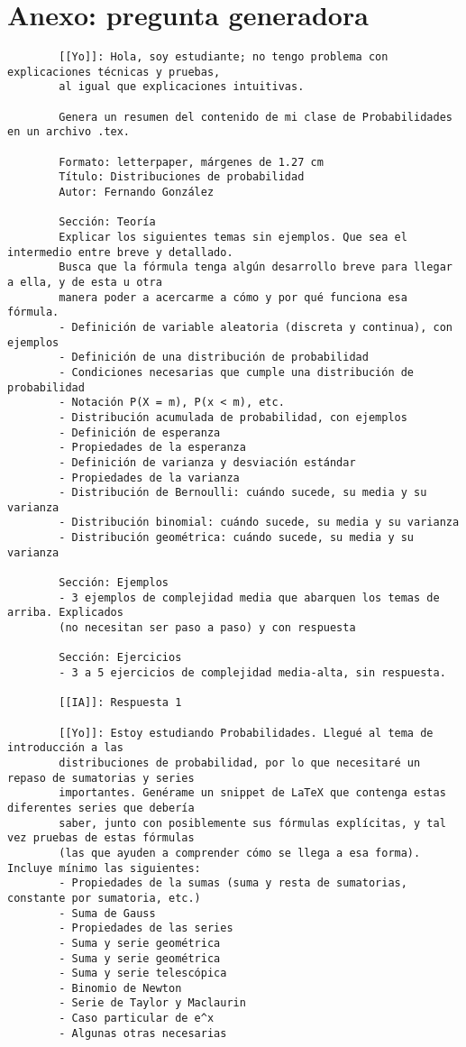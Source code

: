 \documentclass[letterpaper, 12pt]{article}
\begin{document}
	
	\section*{Anexo: pregunta generadora}
	\begin{verbatim}
		[[Yo]]: Hola, soy estudiante; no tengo problema con explicaciones técnicas y pruebas,
		al igual que explicaciones intuitivas.
		
		Genera un resumen del contenido de mi clase de Probabilidades en un archivo .tex.
		
		Formato: letterpaper, márgenes de 1.27 cm
		Título: Distribuciones de probabilidad
		Autor: Fernando González
		
		Sección: Teoría
		Explicar los siguientes temas sin ejemplos. Que sea el intermedio entre breve y detallado.
		Busca que la fórmula tenga algún desarrollo breve para llegar a ella, y de esta u otra
		manera poder a acercarme a cómo y por qué funciona esa fórmula.
		- Definición de variable aleatoria (discreta y continua), con ejemplos
		- Definición de una distribución de probabilidad
		- Condiciones necesarias que cumple una distribución de probabilidad
		- Notación P(X = m), P(x < m), etc.
		- Distribución acumulada de probabilidad, con ejemplos
		- Definición de esperanza
		- Propiedades de la esperanza
		- Definición de varianza y desviación estándar
		- Propiedades de la varianza
		- Distribución de Bernoulli: cuándo sucede, su media y su varianza
		- Distribución binomial: cuándo sucede, su media y su varianza
		- Distribución geométrica: cuándo sucede, su media y su varianza
		
		Sección: Ejemplos
		- 3 ejemplos de complejidad media que abarquen los temas de arriba. Explicados
		(no necesitan ser paso a paso) y con respuesta
		
		Sección: Ejercicios
		- 3 a 5 ejercicios de complejidad media-alta, sin respuesta.
		
		[[IA]]: Respuesta 1
		
		[[Yo]]: Estoy estudiando Probabilidades. Llegué al tema de introducción a las
		distribuciones de probabilidad, por lo que necesitaré un repaso de sumatorias y series
		importantes. Genérame un snippet de LaTeX que contenga estas diferentes series que debería
		saber, junto con posiblemente sus fórmulas explícitas, y tal vez pruebas de estas fórmulas
		(las que ayuden a comprender cómo se llega a esa forma). Incluye mínimo las siguientes:
		- Propiedades de la sumas (suma y resta de sumatorias, constante por sumatoria, etc.)
		- Suma de Gauss
		- Propiedades de las series
		- Suma y serie geométrica
		- Suma y serie geométrica
		- Suma y serie telescópica
		- Binomio de Newton
		- Serie de Taylor y Maclaurin
		- Caso particular de e^x
		- Algunas otras necesarias
		

\end{verbatim}
\end{document}
